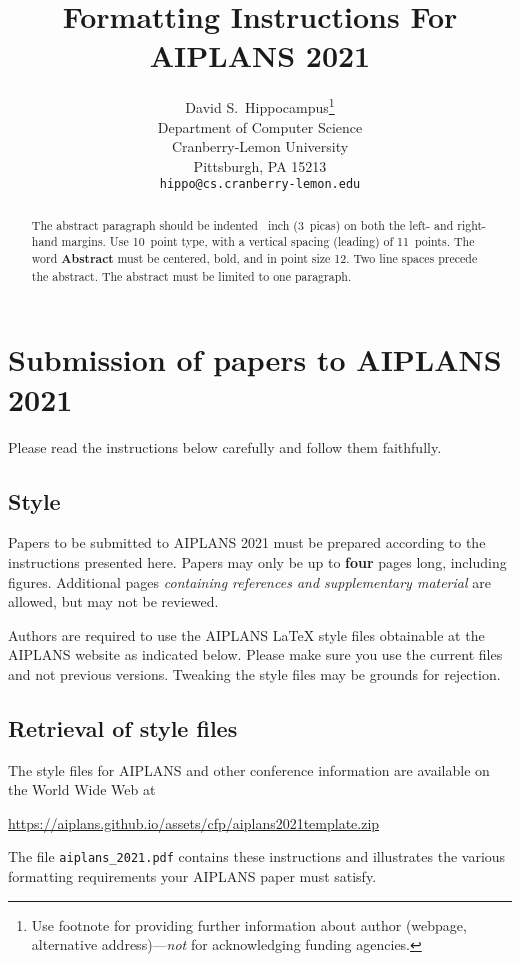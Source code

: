 \documentclass{article}
\title{Formatting Instructions For AIPLANS 2021}
\author{%
  David S.~Hippocampus\thanks{Use footnote for providing further information
  about author (webpage, alternative address)---\emph{not} for acknowledging
  funding agencies.} \\
  Department of Computer Science\\
  Cranberry-Lemon University\\
  Pittsburgh, PA 15213 \\
  \texttt{hippo@cs.cranberry-lemon.edu} \\
}
\begin{document}
  \maketitle

  \begin{abstract}
    The abstract paragraph should be indented ~inch (3~picas) on
    both the left- and right-hand margins. Use 10~point type, with a vertical
    spacing (leading) of 11~points.  The word \textbf{Abstract} must be centered,
    bold, and in point size 12. Two line spaces precede the abstract. The abstract
    must be limited to one paragraph.
  \end{abstract}

  \section{Submission of papers to AIPLANS 2021}

  Please read the instructions below carefully and follow them faithfully.

  \subsection{Style}

  Papers to be submitted to AIPLANS 2021 must be prepared according to the
  instructions presented here. Papers may only be up to {\bf four} pages long,
  including figures. Additional pages \emph{containing references and
  supplementary material} are allowed, but may not be reviewed.

  Authors are required to use the AIPLANS \LaTeX{} style files obtainable at the
  AIPLANS website as indicated below. Please make sure you use the current files
  and not previous versions. Tweaking the style files may be grounds for
  rejection.

  \subsection{Retrieval of style files}

  The style files for AIPLANS and other conference information are available on
  the World Wide Web at
  \begin{center}
    \url{https://aiplans.github.io/assets/cfp/aiplans2021template.zip}
  \end{center}
  The file \verb+aiplans_2021.pdf+ contains these instructions and illustrates the
  various formatting requirements your AIPLANS paper must satisfy.
\end{document}
